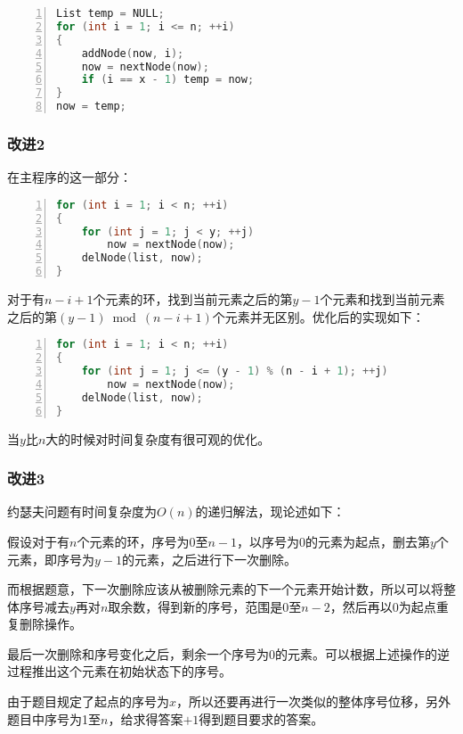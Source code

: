 \documentclass{article}
\begin{document}
\begin{lstlisting}[language={C},
    numbers=left,
    numberstyle=\tiny\menlo,
    basicstyle=\small\menlo]
List temp = NULL;
for (int i = 1; i <= n; ++i)
{
    addNode(now, i);
    now = nextNode(now);
    if (i == x - 1) temp = now;
}
now = temp;
\end{lstlisting}

\subsubsection{改进2}

在主程序的这一部分：

\begin{lstlisting}[language={C},
    numbers=left,
    numberstyle=\tiny\menlo,
    basicstyle=\small\menlo]
for (int i = 1; i < n; ++i)
{
    for (int j = 1; j < y; ++j)
        now = nextNode(now);
    delNode(list, now);
}
\end{lstlisting}

对于有$n-i+1$个元素的环，找到当前元素之后的第$y-1$个元素和找到当前元素之后的第$(y-1)\bmod (n-i+1)$个元素并无区别。优化后的实现如下：

\begin{lstlisting}[language={C},
    numbers=left,
    numberstyle=\tiny\menlo,
    basicstyle=\small\menlo]
for (int i = 1; i < n; ++i)
{
    for (int j = 1; j <= (y - 1) % (n - i + 1); ++j)
        now = nextNode(now);
    delNode(list, now);
}
\end{lstlisting}

当$y$比$n$大的时候对时间复杂度有很可观的优化。

\subsubsection{改进3}

约瑟夫问题有时间复杂度为$O(n)$的递归解法，现论述如下：

假设对于有$n$个元素的环，序号为0至$n-1$，以序号为0的元素为起点，删去第$y$个元素，即序号为$y-1$的元素，之后进行下一次删除。

而根据题意，下一次删除应该从被删除元素的下一个元素开始计数，所以可以将整体序号减去$y$再对$n$取余数，得到新的序号，范围是0至$n-2$，然后再以0为起点重复删除操作。

最后一次删除和序号变化之后，剩余一个序号为0的元素。可以根据上述操作的逆过程推出这个元素在初始状态下的序号。

由于题目规定了起点的序号为$x$，所以还要再进行一次类似的整体序号位移，另外题目中序号为1至$n$，给求得答案$+1$得到题目要求的答案。
\end{document}
